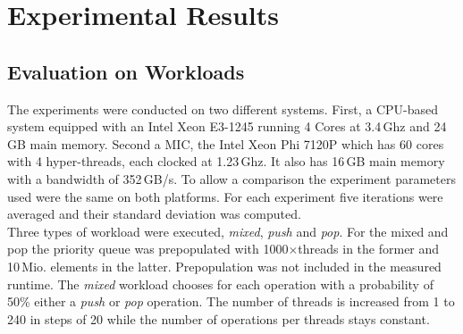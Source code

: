 \section{Experimental Results}
\label{sec:exp}
\subsection{Evaluation on Workloads}
The experiments were conducted on two different systems. First, a CPU-based system equipped with an Intel Xeon E3-1245 running 4 Cores at 3.4\,Ghz and 24\,GB main memory. Second a MIC, the Intel Xeon Phi 7120P which has 60 cores with 4 hyper-threads, each clocked at 1.23\,Ghz. It also has 16\,GB main memory with a bandwidth of 352\,GB/s. To allow a comparison the experiment parameters used were the same on both platforms. For each experiment five iterations were averaged and their standard deviation was computed.\\
Three types of workload were executed, \textit{mixed}, \textit{push} and \textit{pop}. For the mixed and pop the priority queue was prepopulated with 1000$\times$threads in the former and 10\,Mio. elements in the latter. Prepopulation was not included in the measured runtime. The \textit{mixed} workload chooses for each operation with a probability of 50\% either a \textit{push} or \textit{pop} operation. The number of threads is increased from 1 to 240 in steps of 20 while the number of operations per threads stays constant.

